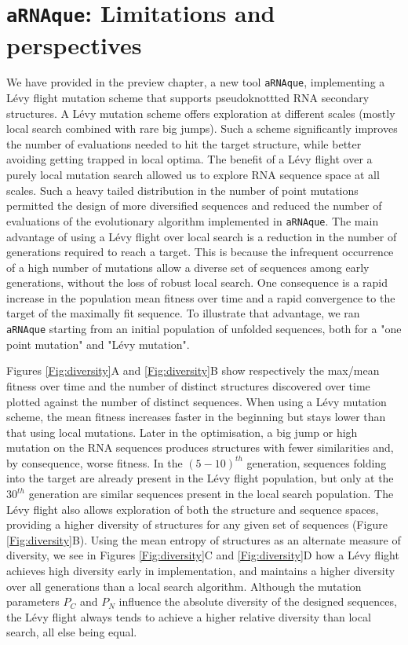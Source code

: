 \section{\texttt{aRNAque}: Limitations and perspectives}
We have provided in the preview chapter, a new tool \texttt{aRNAque},  implementing a Lévy flight mutation scheme that supports pseudoknottted RNA secondary structures. A Lévy mutation scheme offers exploration at different scales (mostly local search combined with rare big jumps). Such a scheme significantly improves the number of evaluations needed to hit the target structure, while better avoiding getting trapped in local optima. The benefit of a Lévy flight over a purely local  mutation search allowed us to explore RNA sequence space at all scales. Such a heavy tailed distribution in the number of point mutations permitted the design of more diversified sequences and reduced the number of evaluations of the evolutionary algorithm implemented in \texttt{aRNAque}. The main advantage of using a Lévy flight over local search is a reduction in the number of generations required to reach a target. This is because the infrequent occurrence of a high number of mutations allow a diverse set of sequences among early generations, without the loss of robust local search. One consequence is a rapid increase in the population mean fitness over time and a rapid convergence to the target of the maximally fit sequence. To illustrate that advantage, we ran \texttt{aRNAque} starting from an initial population of unfolded sequences, both for a "one point mutation" and "Lévy mutation".

Figures  \ref{Fig:diversity}A and  \ref{Fig:diversity}B show respectively the max/mean fitness over time and the number of distinct structures discovered over time plotted against the number of distinct sequences. When using a Lévy mutation scheme, the mean fitness increases faster in the beginning but stays lower than that using local mutations. Later in the optimisation, a big jump or high mutation on the RNA sequences produces structures with fewer similarities and, by consequence, worse fitness. In the $(5-10)^{th}$ generation, sequences folding into the target are already present in the Lévy flight population, but only at the $30^{th}$ generation are similar sequences present in the local search population. The Lévy flight also allows exploration of both the structure and sequence spaces, providing a higher diversity of structures for any given set of sequences (Figure \ref{Fig:diversity}B). Using the mean entropy of structures as an alternate measure of diversity, we see in Figures \ref{Fig:diversity}C and \ref{Fig:diversity}D how a Lévy flight achieves high diversity early in implementation, and maintains a higher diversity over all generations than a local search algorithm. Although the mutation parameters $P_C$ and $P_N$ influence the absolute diversity of the designed sequences, the Lévy flight always tends to achieve a higher relative diversity than local search, all else being equal. 

